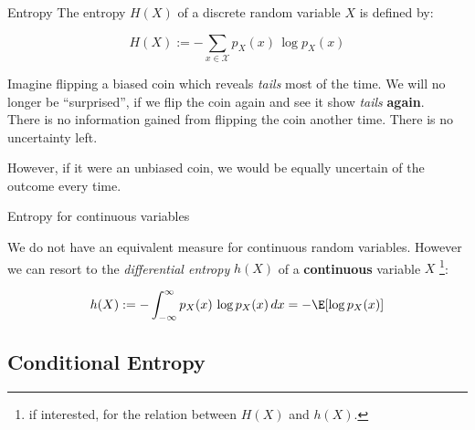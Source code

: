 \begin{frame}

\begin{block}{Entropy} 
The entropy $H(X)$ of a discrete random variable $X$ is defined by:

\begin{equation}
\label{eq:entropy}
H(X) := - \sum_{x \in \mathcal X} p_X(x)\,\log p_X(x)
\end{equation}

\end{block}

Imagine flipping a biased coin which reveals \textit{tails} most of the time. 
We will no longer be ``surprised'', if we flip the coin again and see it show \textit{tails} \textbf{again}.\\

There is no information gained from flipping the coin another time. There is no uncertainty left.

However, if it were an unbiased coin, we would be equally uncertain of the outcome every time.

\end{frame}

\begin{frame}{Entropy for continuous variables}

We do not have an equivalent measure for continuous random variables. 
However we can resort to the \emph{differential entropy} $h(X)$ of a \textbf{continuous} variable $X$
\footnote{if interested, \citealp[see][Ch~10.2]{haykin1994neural} for the relation between $H(X)$ and $h(X)$.}:

\begin{equation}
\label{eq:entropydiff}
h(X) := - \int_{-\infty}^{\infty} p_X(x)\,\log p_X(x) \, dx 
= - \E \lbrack \log p_X(x) \rbrack
\end{equation}

\end{frame}




\subsection{Conditional Entropy}

